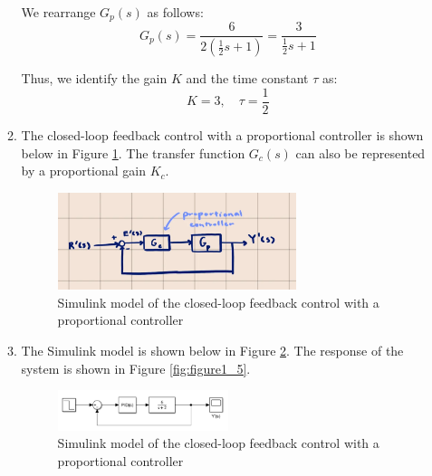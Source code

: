 \documentclass[12pt]{article}
\begin{document}
\begin{enumerate}
\begin{enumerate}
    We rearrange \( G_p(s) \) as follows:
    \[
    G_p(s) = \frac{6}{2(\frac{1}{2}s + 1)} = \frac{3}{\frac{1}{2}s + 1}
    \]

    Thus, we identify the gain \( K \) and the time constant \( \tau \) as:
    \[
    K = 3, \quad \tau = \frac{1}{2}
    \]

    \item 
    The closed-loop feedback control with a proportional controller is shown below in Figure \ref{fig:figure1_3}. The transfer function $G_c(s)$ can also be represented by a proportional gain $K_c$.

    \begin{figure}[H]
      \centering
      \includegraphics[width=0.7\textwidth]{Figures/Models/model1_2.png}
      \caption{Simulink model of the closed-loop feedback control with a proportional controller}
      \label{fig:figure1_3}
    \end{figure}
    
    \pagebreak
    
    \item 
    The Simulink model is shown below in Figure \ref{fig:figure1_4}. The response of the system is shown in Figure \ref{fig:figure1_5}.

    \begin{figure}[H]
      \centering
      \includegraphics[width=0.5\textwidth]{Figures/Models/model1_3.png}
      \caption{Simulink model of the closed-loop feedback control with a proportional controller}
      \label{fig:figure1_4}
    \end{figure}


\end{enumerate}
\end{enumerate}
\end{document}

